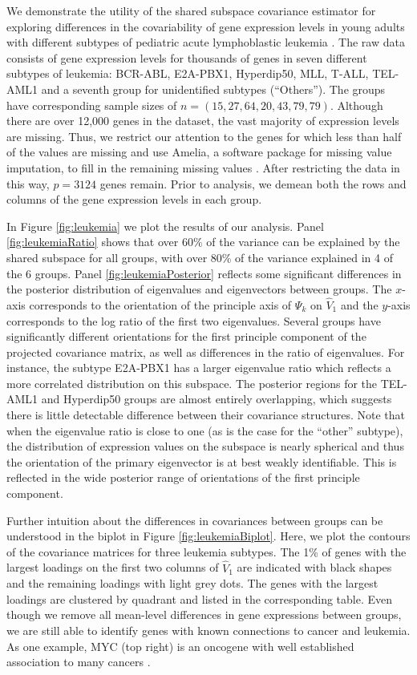 \documentclass[12pt]{article}
\begin{document}
We demonstrate the utility of the shared subspace covariance
estimator for exploring differences in the covariability of gene
expression levels in young adults with different subtypes of pediatric
acute lymphoblastic leukemia \citep{Yeoh2002}.  The raw data consists
of gene expression levels for thousands of genes in seven different
subtypes of leukemia: BCR-ABL, E2A-PBX1, Hyperdip50, MLL, T-ALL,
TEL-AML1 and a seventh group for unidentified subtypes (``Others'').  The groups
have corresponding sample sizes of $n = (15, 27, 64, 20, 43, 79, 79)$.
Although there are over 12,000 genes in the dataset, the vast majority of expression
levels are missing.  Thus, we restrict our attention to the genes for
which less than half of the values are missing and use Amelia, a
software package for missing value imputation, to fill in the
remaining missing values \citep{Amelia}.  After restricting the data
in this way, $p=3124$ genes remain.  Prior to analysis, we demean both
the rows and columns of the gene expression levels in each group.

In Figure \ref{fig:leukemia} we plot the results of our analysis.
Panel \ref{fig:leukemiaRatio} shows that over $60\%$ of the variance
can be explained by the  shared subspace for all
groups, with over 80\% of the variance explained in  4 of the 6 groups.  Panel
\ref{fig:leukemiaPosterior} reflects some significant differences in
the posterior distribution of eigenvalues and eigenvectors between
groups.  The $x$-axis corresponds to the orientation of the principle
axis of $\Psi_k$ on $\hat{V}_1$ and the $y$-axis corresponds to the log ratio of
the first two eigenvalues.  Several groups have significantly
different orientations for the first principle component of the
projected covariance matrix, as well as differences in the ratio of
eigenvalues.  For instance, the subtype E2A-PBX1 has a larger
eigenvalue ratio which reflects a more correlated distribution on this
subspace.  The posterior regions for the TEL-AML1 and Hyperdip50
groups are almost entirely overlapping, which suggests there is little
detectable difference between their covariance structures.  Note that
when the eigenvalue ratio is close to one (as is the case for the
``other'' subtype), the distribution of expression values on the
subspace is nearly spherical and thus the orientation of the primary
eigenvector is at best weakly identifiable.  This is reflected in the
wide posterior range of orientations of the first principle component.

Further intuition about the differences in covariances between groups
can be understood in the biplot in Figure \ref{fig:leukemiaBiplot}.
Here, we plot the contours of the covariance matrices for three
leukemia subtypes. The 1\% of genes with the largest loadings on the
first two columns of $\hat{V}_1$ are indicated with black shapes and the
remaining loadings with light grey dots.  The genes with the largest
loadings are clustered by quadrant and listed in the corresponding
table.  Even though we remove all mean-level differences in gene
expressions between groups, we are still able to identify genes with
known connections to cancer and leukemia.  As one example, MYC (top
right) is an oncogene with well established association to many
cancers \citep{Dang2012}.
\end{document}
